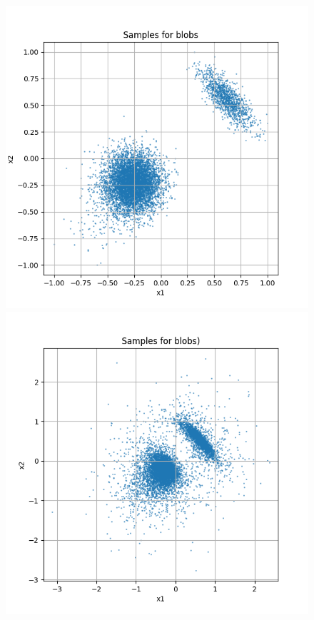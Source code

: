\documentclass[a4paper,12pt]{article}
\begin{document}
\begin{figure}[h]
  \centering
  \begin{minipage}{0.3\textwidth}
      \centering
      \includegraphics[width=\linewidth]{images/blobs.png}
  \end{minipage}
  \begin{minipage}{0.3\textwidth}
      \centering
      \includegraphics[width=\linewidth]{"images/Samples for ddpm_2_10_0.0001_0.02_blobs.png"}

\end{minipage}
\end{figure}
\end{document}
